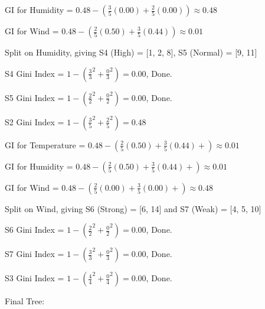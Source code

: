 \documentclass[12pt, fullpage,letterpaper]{article}
\begin{document}
\begin{enumerate}
\begin{enumerate}
\begin{framed}
		GI for Humidity = $0.48 - (\frac{3}{5}(0.00) + \frac{2}{5}(0.00)) \approx 0.48$
		
		GI for Wind = $0.48 - (\frac{2}{5}(0.50) + \frac{3}{5}(0.44)) \approx 0.01$
		
		Split on Humidity, giving S4 (High) = [1, 2, 8], S5 (Normal) = [9, 11]
		
		\bigskip
		
		S4 Gini Index = $1 - (\frac{3}{3}^2 + \frac{0}{3}^2) = 0.00$, Done.
		
		S5 Gini Index = $1 - (\frac{2}{2}^2 + \frac{0}{2}^2) = 0.00$, Done.	
		
		\bigskip
		
		S2 Gini Index = $1 - (\frac{3}{5}^2 + \frac{2}{5}^2) = 0.48$
		
		GI for Temperature = $0.48 - (\frac{2}{5}(0.50) + \frac{3}{5}(0.44) + ) \approx 0.01$
		
		GI for Humidity = $0.48 - (\frac{2}{5}(0.50) + \frac{3}{5}(0.44) + ) \approx 0.01$
		
		GI for Wind = $0.48 - (\frac{2}{5}(0.00) + \frac{3}{5}(0.00) + ) \approx 0.48$
		
		Split on Wind, giving S6 (Strong) = [6, 14] and S7 (Weak) = [4, 5, 10]
		
		\bigskip
		
		S6 Gini Index = $1 - (\frac{2}{2}^2 + \frac{0}{2}^2) = 0.00$, Done.
		
		S7 Gini Index = $1 - (\frac{3}{3}^2 + \frac{0}{3}^2) = 0.00$, Done.
		
		\bigskip
		
		S3 Gini Index = $1 - (\frac{4}{4}^2 + \frac{0}{4}^2) = 0.00$, Done.
		
		\bigskip
		
		Final Tree:
		

\end{framed}
\end{enumerate}
\end{enumerate}
\end{document}
